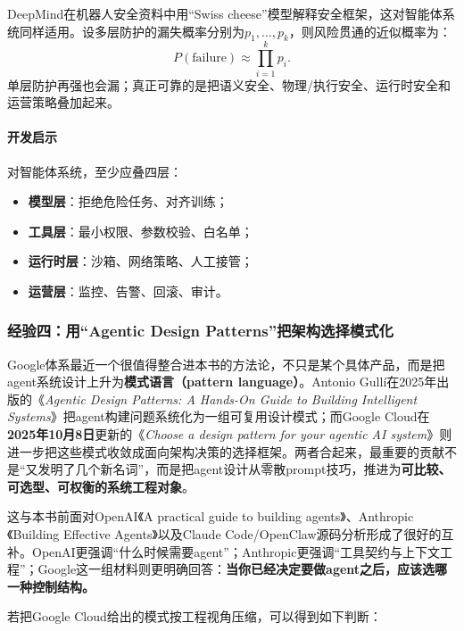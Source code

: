\documentclass[12pt,a4paper]{article}
\begin{document}
DeepMind在机器人安全资料中用“Swiss cheese”模型解释安全框架，这对智能体系统同样适用。设多层防护的漏失概率分别为$p_1,\ldots,p_k$，则风险贯通的近似概率为：
\begin{equation}
P(\text{failure}) \approx \prod_{i=1}^{k} p_i.
\end{equation}
单层防护再强也会漏；真正可靠的是把语义安全、物理/执行安全、运行时安全和运营策略叠加起来。

\paragraph{开发启示}

对智能体系统，至少应叠四层：
\begin{itemize}
    \item \textbf{模型层}：拒绝危险任务、对齐训练；
    \item \textbf{工具层}：最小权限、参数校验、白名单；
    \item \textbf{运行时层}：沙箱、网络策略、人工接管；
    \item \textbf{运营层}：监控、告警、回滚、审计。
\end{itemize}


\subsubsection{经验四：用“Agentic Design Patterns”把架构选择模式化}

Google体系最近一个很值得整合进本书的方法论，不只是某个具体产品，而是把agent系统设计上升为\textbf{模式语言（pattern language）}。Antonio Gullí在2025年出版的《\textit{Agentic Design Patterns: A Hands-On Guide to Building Intelligent Systems}》把agent构建问题系统化为一组可复用设计模式；而Google Cloud在\textbf{2025年10月8日}更新的《\textit{Choose a design pattern for your agentic AI system}》则进一步把这些模式收敛成面向架构决策的选择框架。两者合起来，最重要的贡献不是“又发明了几个新名词”，而是把agent设计从零散prompt技巧，推进为\textbf{可比较、可选型、可权衡的系统工程对象}。

这与本书前面对OpenAI《A practical guide to building agents》、Anthropic《Building Effective Agents》以及Claude Code/OpenClaw源码分析形成了很好的互补。OpenAI更强调“什么时候需要agent”；Anthropic更强调“工具契约与上下文工程”；Google这一组材料则更明确回答：\textbf{当你已经决定要做agent之后，应该选哪一种控制结构。}

若把Google Cloud给出的模式按工程视角压缩，可以得到如下判断：
\end{document}
